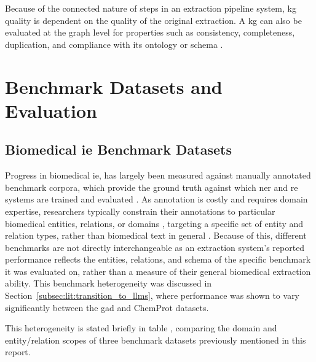 Because of the connected nature of steps in an extraction pipeline system, \gls{kg} quality is dependent on the quality of the original extraction. A \gls{kg} can also be evaluated at the graph level for properties such as consistency, completeness, duplication, and compliance with its ontology or schema \pref.

\section{Benchmark Datasets and Evaluation}
\label{sec:lit:Benchmark Datasets and Evaluation}

\subsection{Biomedical \gls{ie} Benchmark Datasets}
\label{subsec:lit:biomed_ie_benchmark_datasets}
Progress in biomedical \gls{ie}, has largely been measured against manually annotated benchmark corpora, which provide the ground truth against which \gls{ner} and \gls{re} systems are trained and evaluated \pref. As annotation is costly and requires domain expertise, researchers typically constrain their annotations to particular biomedical entities, relations, or domains \pref, targeting a specific set of entity and relation types, rather than biomedical text in general \pref. Because of this, different benchmarks are not directly interchangeable as an extraction system's reported performance reflects the entities, relations, and schema of the specific benchmark it was evaluated on, rather than a measure of their general biomedical extraction ability. This benchmark heterogeneity was discussed in Section~\ref{subsec:lit:transition_to_llms}, where performance was shown to vary significantly between the \gls{gad} and ChemProt datasets.

This heterogeneity is stated briefly in table \pref, comparing the domain and entity/relation scopes of three benchmark datasets previously mentioned in this report.

